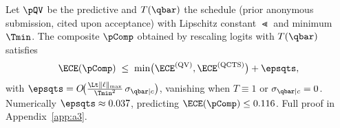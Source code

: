 
\begin{corollary}\label{cor:composite-compact}
Let $\pQV$ be the \qvib{} predictive and $T(\qbar)$ the \qcts{} schedule (prior anonymous
submission, cited upon acceptance) with Lipschitz constant $\Lt$ and minimum $\Tmin$. The
composite $\pComp$ obtained by rescaling \qvib{} logits with $T(\qbar)$ satisfies
\begin{equation}
\ECE(\pComp) \;\leq\; \min\!\big(\ECE^{(\mathrm{QV})}, \ECE^{(\mathrm{QCTS})}\big) + \epsqts,
\label{eq:cor1-body}
\end{equation}
with $\epsqts = O\!\big(\tfrac{\Lt\|\ell\|_{\max}}{\Tmin^2}\,\sigma_{\qbar\mid c}\big)$, vanishing
when $T\equiv 1$ or $\sigma_{\qbar\mid c}=0$. Numerically $\epsqts\approx 0.037$, predicting
$\ECE(\pComp)\leq 0.116$. Full proof in Appendix~\ref{app:a3}.
\end{corollary}
